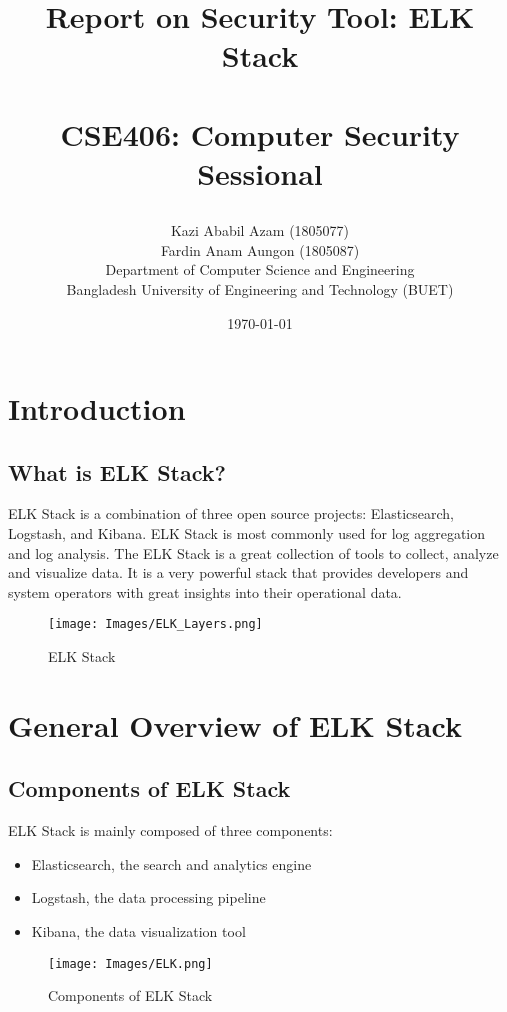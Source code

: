 \documentclass{report}
\title{
	\endgraf\bigskip
	
	\begin{center}
		\Huge {{Report on Security Tool: ELK Stack} }\\\\
		\vspace{0.5cm}
		\large {CSE406: Computer Security Sessional}
	\end{center}
	\bigskip
	\bigskip
}
\author{
    \large{Kazi Ababil Azam (1805077)}\\
	\large{Fardin Anam Aungon (1805087)}\\
	\large{Department of Computer Science and Engineering}\\
    \large{Bangladesh University of Engineering and Technology (BUET)}
}
\date{
	\endgraf\bigskip
	\Large{\today}
}
\begin{document}
\maketitle
\tableofcontents


\chapter{Introduction}

\section{What is ELK Stack?}
ELK Stack is a combination of three open source projects: Elasticsearch, Logstash, and Kibana. 
ELK Stack is most commonly used for log aggregation and log analysis. The ELK Stack is a great collection
of tools to collect, analyze and visualize data. It is a very powerful stack that provides developers and
system operators with great insights into their operational data.


\begin{figure}[h]
	\centering
	\texttt{[image: Images/ELK\_Layers.png]}
	\caption{ELK Stack}
	\label{fig:Components of ELK Stack}
\end{figure} 

\chapter{General Overview of ELK Stack}
\section{Components of ELK Stack}
ELK Stack is mainly composed of three components:
\begin{itemize}
	\item Elasticsearch, the search and analytics engine
	\item Logstash, the data processing pipeline
	\item Kibana, the data visualization tool
\end{itemize}

\begin{figure}[h]
	\centering
	\texttt{[image: Images/ELK.png]}
	\caption{Components of ELK Stack}
	\label{fig:ELK Stack}
\end{figure}
\end{document}
